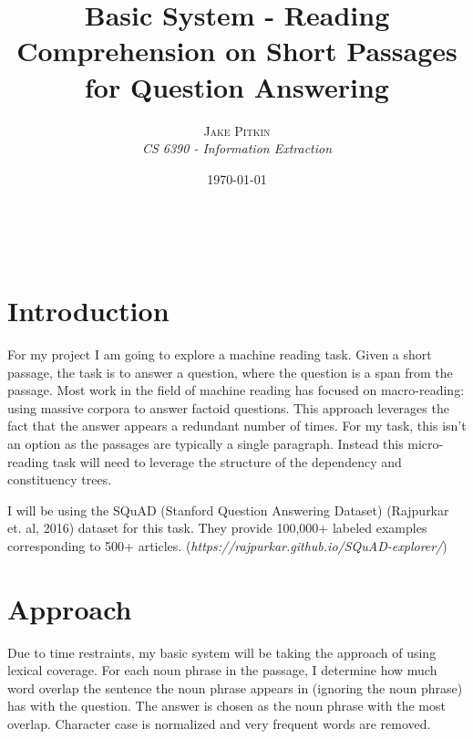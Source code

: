 \documentclass[a4paper, 11pt]{article} %
\title{\textbf{Basic System - Reading Comprehension on Short Passages for Question Answering}\\ %
} %
\author{\textsc{Jake Pitkin} %
\\{\textit{CS 6390 - Information Extraction}}} %
\date{\today} %
\makeatletter
\renewcommand{\maketitle}{ %
\begin{flushright} %
{\LARGE\@title} %

\vspace{50pt} %

{\large\@author} %
\\\@date %

\vspace{40pt} %
\end{flushright}
}
\makeatother
\begin{document}
\maketitle %




\section*{Introduction}

For my project I am going to explore a machine reading task. Given a short passage, the task is to answer a question, where the question is a span from the passage. Most work in the field of machine reading has focused on macro-reading: using massive corpora to answer factoid questions. This approach leverages the fact that the answer appears a redundant number of times. For my task, this isn't an option as the passages are typically a single paragraph. Instead this micro-reading task will need to leverage the structure of the dependency and constituency trees.

I will be using the SQuAD (Stanford Question Answering Dataset) (Rajpurkar et. al, 2016) dataset for this task. They provide 100,000+ labeled examples corresponding to 500+ articles. (\textit{https://rajpurkar.github.io/SQuAD-explorer/})
 

\section*{Approach}

Due to time restraints, my basic system will be taking the approach of using lexical coverage. For each noun phrase in the passage, I determine how much word overlap the sentence the noun phrase appears in (ignoring the noun phrase) has with the question. The answer is chosen as the noun phrase with the most overlap. Character case is normalized and very frequent words are removed. 
\end{document}
